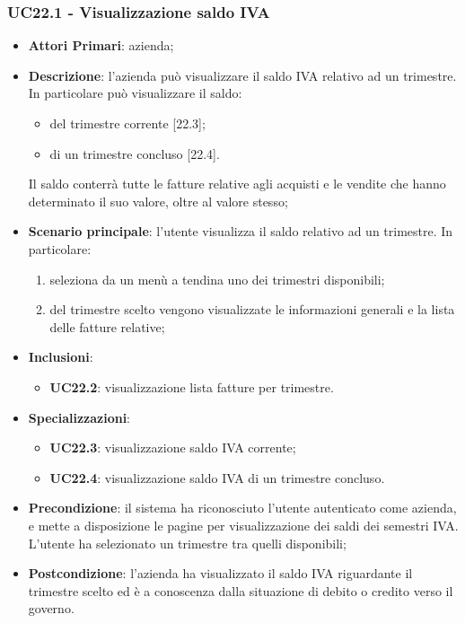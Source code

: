 \subsubsection{UC22.1 - Visualizzazione saldo IVA}
\begin{itemize}
	\item \textbf{Attori Primari}: azienda;
	\item \textbf{Descrizione}: l'azienda può visualizzare il saldo IVA relativo ad un trimestre. In particolare può visualizzare il saldo:
	\begin{itemize}
		\item del trimestre corrente [22.3];
		\item di un trimestre concluso [22.4].
	\end{itemize}
	Il saldo conterrà tutte le fatture relative agli acquisti e le vendite che hanno determinato il suo valore, oltre al valore stesso;
	\item \textbf{Scenario principale}: l'utente visualizza il saldo relativo ad un trimestre. In particolare:
	\begin{enumerate}[label=\alph*.]
		\item seleziona da un menù a tendina uno dei trimestri disponibili;
		\item del trimestre scelto vengono visualizzate le informazioni generali e la lista delle fatture relative;
	\end{enumerate}
	\item \textbf{Inclusioni}: 
	\begin{itemize}
		\item \textbf{UC22.2}: visualizzazione lista fatture per trimestre.
	\end{itemize}
	\item \textbf{Specializzazioni}: 
	\begin{itemize}
		\item \textbf{UC22.3}: visualizzazione saldo IVA corrente;
		\item \textbf{UC22.4}:  visualizzazione saldo IVA di un trimestre concluso.
	\end{itemize}
	\item \textbf{Precondizione}: il sistema ha riconosciuto l'utente autenticato come azienda, e mette a disposizione le pagine per visualizzazione dei saldi dei semestri IVA. L'utente ha selezionato un trimestre tra quelli disponibili;
	\item \textbf{Postcondizione}: l'azienda ha visualizzato il saldo IVA riguardante il trimestre scelto ed è a conoscenza dalla situazione di debito o credito verso il governo.
\end{itemize} 
